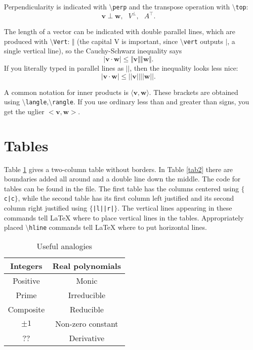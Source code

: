 \documentclass[12pt,letterpaper]{amsart}
\newcommand{\latex}{\LaTeX}
\newcommand{\sm}{\setminus}
\newcommand{\pln}[1]{$\sm${\tt #1}}
\theoremstyle{plain}
\theoremstyle{definition}
\numberwithin{equation}{section}
\begin{document}
Perpendicularity is indicated with \pln{perp} and the transpose 
operation with \pln{top}:
$$
{\mathbf v} \perp {\mathbf w}, \ \ \ V^\perp, \ \ \ A^\top.
$$

The length of a vector can be indicated with double parallel lines, which 
are produced with
\pln{Vert}: 
$\Vert$ (the capital V is important, since 
\pln{vert} 
outputs $\vert$, a single 
vertical line), 
so the Cauchy-Schwarz inequality says 
$$
|{\mathbf v}\cdot{\mathbf w}| \leq \Vert{\mathbf v}\Vert\Vert{\mathbf w}\Vert.
$$
If you literally typed in parallel lines as $||$, then the 
inequality looks less nice:
$$
|{\mathbf v}\cdot{\mathbf w}| \leq ||{\mathbf v}||||{\mathbf w}||.
$$


A common notation for inner products is 
$\langle {\mathbf v},{\mathbf w}\rangle$.  These 
brackets are obtained using \pln{langle},\pln{rangle}. 
If you use ordinary less than and greater than signs, you 
get the uglier $<{\mathbf v},{\mathbf w}>$.


\section{Tables}

Table \ref{tab1} gives a two-column table without borders. 
In Table \ref{tab2} there are boundaries added all around 
and a double line down the middle. 
The code for tables can be found in the file.  
The first table has the columns centered using 
{\tt $\{$c|c$\}$}, while the second table 
has its first column left justified and 
its second column right justified using 
{\tt $\{$|l||r|$\}$}.  The vertical lines 
appearing in these commands tell \latex{} 
where to place vertical lines in the tables. 
Appropriately placed \pln{hline} commands 
tell \latex{} where to put horizontal lines. 

\begin{table}[ht]
\begin{center}
\begin{tabular}{c|c} 
Integers & Real polynomials \\ \hline
Positive & Monic \\
Prime & Irreducible \\
Composite & Reducible \\
$\pm 1$ & Non-zero constant \\ 
?? & Derivative \\
\end{tabular}
\caption{Useful analogies}\label{tab1}
\end{center}
\end{table}
\end{document}
